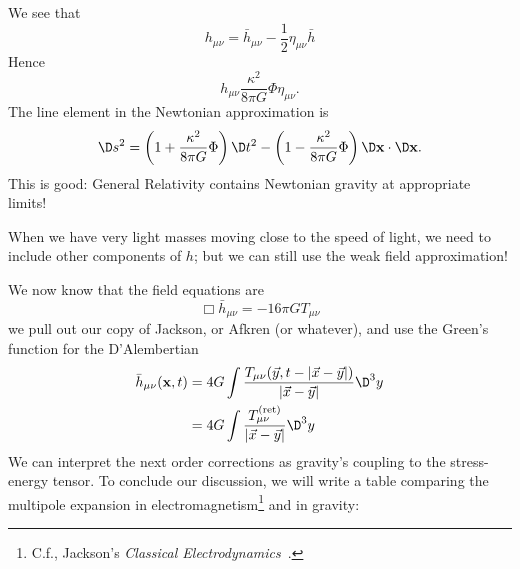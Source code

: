 We see that
\begin{equation}
h_{\mu\nu}=\bar{h}_{\mu\nu}-\frac{1}{2}\eta_{\mu\nu}\bar{h}
\end{equation}
Hence
\begin{equation}
h_{\mu\nu}\frac{\kappa^{2}}{8\pi G}\Phi\eta_{\mu\nu}.
\end{equation}
The line element in the Newtonian approximation is
\begin{equation}
\D s^{2}=\left(1+\frac{\kappa^{2}}{8\pi G}\Phi\right)\D t^{2}
-\left(1-\frac{\kappa^{2}}{8\pi G}\Phi\right)\D\mathbf{x}\cdot\D\mathbf{x}.
\end{equation}
This is good: General Relativity contains Newtonian gravity at
appropriate limits!

\begin{rmk}
When we have very light masses moving close to the speed of
light, we need to include other components of $h$; but we can
still use the weak field approximation!
\end{rmk}

We now know that the field equations are
\begin{equation}
\Box\bar{h}_{\mu\nu}=-16\pi GT_{\mu\nu}
\end{equation}
we pull out our copy of Jackson, or Afkren (or whatever), and use
the Green's function for the D'Alembertian
\begin{equation}
\begin{split}
\bar{h}_{\mu\nu}(\mathbf{x},t) &= 
4
G\int \frac{T_{\mu\nu}(\vec{y},t-|\vec{x}-\vec{y}|)}{|\vec{x}-\vec{y}|}\D^{3}y\\
&=4
G\int \frac{T_{\mu\nu}^{\text{(ret)}}}{|\vec{x}-\vec{y}|}\D^{3}y
\end{split}
\end{equation}
We can interpret the next order corrections as gravity's coupling
to the stress-energy tensor. To conclude our discussion, we will
write a table comparing the multipole expansion in
electromagnetism\footnote{C.f., Jackson's \emph{Classical
Electrodynamics}~\cite[{\normalfont p.145 \emph{et seq.}}]{jackson:1999}.} and in gravity:

